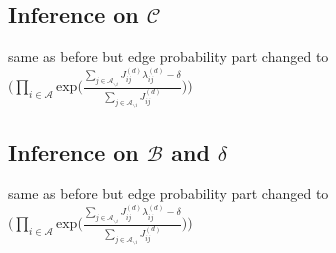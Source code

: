 \documentclass[a4paper]{article}
\begin{document}
          \subsection{Inference on $\mathcal{C}$}
                same as before but edge probability part changed to $\Big(\prod_{i\in \mathcal{A}}\mbox{exp}\Big(\frac{\sum_{j \in \mathcal{A}_{\backslash i}}J^{(d)}_{ij}\lambda^{(d)}_{ij} - \delta}{\sum\limits_{j \in \mathcal{A}_{\backslash i}}J^{(d)}_{ij}}\Big)\Big)$
    \subsection{Inference on $\mathcal{B}$ and $\delta$}
          same as before but edge probability part changed to $\Big(\prod_{i\in \mathcal{A}}\mbox{exp}\Big(\frac{\sum_{j \in \mathcal{A}_{\backslash i}}J^{(d)}_{ij}\lambda^{(d)}_{ij} - \delta}{\sum\limits_{j \in \mathcal{A}_{\backslash i}}J^{(d)}_{ij}}\Big)\Big)$
\end{document}
